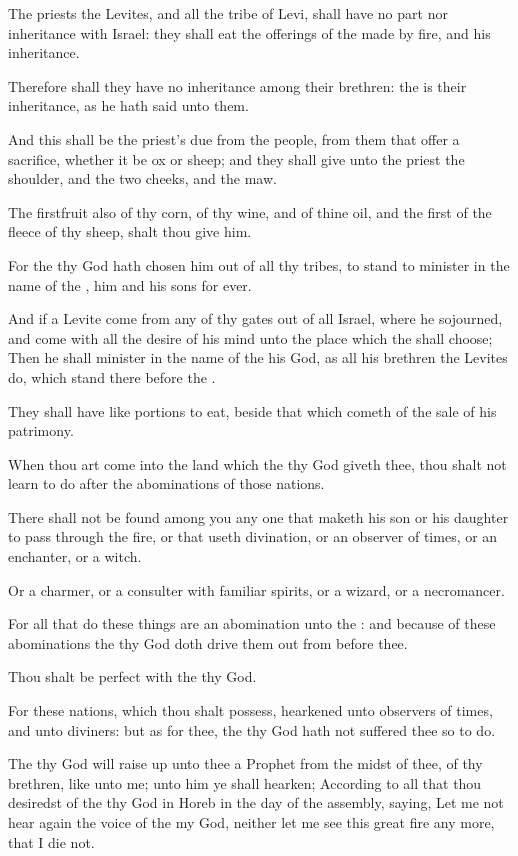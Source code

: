 \Chapter
\Verse The priests the Levites, and all the tribe of Levi, shall have no part nor inheritance with Israel: they shall eat the offerings of the \LORD made by fire, and his inheritance.

\Verse Therefore shall they have no inheritance among their brethren: the \LORD is their inheritance, as he hath said unto them.

\Verse And this shall be the priest's due from the people, from them that offer a sacrifice, whether it be ox or sheep; and they shall give unto the priest the shoulder, and the two cheeks, and the maw.

\Verse The firstfruit also of thy corn, of thy wine, and of thine oil, and the first of the fleece of thy sheep, shalt thou give him.

\Verse For the \LORD thy God hath chosen him out of all thy tribes, to stand to minister in the name of the \LORD, him and his sons for ever.

\Verse And if a Levite come from any of thy gates out of all Israel, where he sojourned, and come with all the desire of his mind unto the place which the \LORD shall choose; \Verse Then he shall minister in the name of the \LORD his God, as all his brethren the Levites do, which stand there before the \LORD.

\Verse They shall have like portions to eat, beside that which cometh of the sale of his patrimony.

\Verse When thou art come into the land which the \LORD thy God giveth thee, thou shalt not learn to do after the abominations of those nations.

\Verse There shall not be found among you any one that maketh his son or his daughter to pass through the fire, or that useth divination, or an observer of times, or an enchanter, or a witch.

\Verse Or a charmer, or a consulter with familiar spirits, or a wizard, or a necromancer.

\Verse For all that do these things are an abomination unto the \LORD: and because of these abominations the \LORD thy God doth drive them out from before thee.

\Verse Thou shalt be perfect with the \LORD thy God.

\Verse For these nations, which thou shalt possess, hearkened unto observers of times, and unto diviners: but as for thee, the \LORD thy God hath not suffered thee so to do.

\Verse The \LORD thy God will raise up unto thee a Prophet from the midst of thee, of thy brethren, like unto me; unto him ye shall hearken; \Verse According to all that thou desiredst of the \LORD thy God in Horeb in the day of the assembly, saying, Let me not hear again the voice of the \LORD my God, neither let me see this great fire any more, that I die not.


